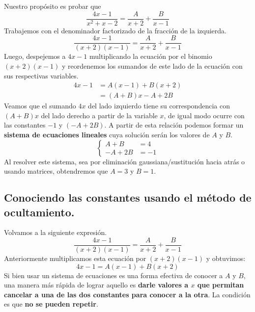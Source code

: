 \documentclass[12pt]{article}
\begin{document}
Nuestro propósito es probar que
\[
  \frac{4x - 1}{x^{2} + x - 2} = \frac{A}{x + 2} + \frac{B}{x - 1}
\]
Trabajemos con el denominador factorizado de la fracción de la izquierda.
\[
  \frac{4x - 1}{(x + 2)(x - 1)} = \frac{A}{x + 2} + \frac{B}{x - 1}
\]
Luego, despejemos a $4x - 1$ multiplicando la ecuación por el binomio $(x + 2)(x - 1)$ y reordenemos los sumandos de este lado de la ecuación con sus respectivas variables.
\begin{align*}
  4x - 1 &= A(x - 1) + B(x + 2) \\
         &= (A + B)x - A + 2B
\end{align*}
Veamos que el sumando $4x$ del lado izquierdo tiene su correspondencia con $(A + B)x$ del lado derecho a partir de la variable $x$, de igual modo ocurre con las constantes $-1$ y $(-A + 2B)$. A partir de esta relación podemos formar un \textbf{sistema de ecuaciones lineales} cuya solución serán los valores de $A$ y $B$.
\[
\left\{
\begin{aligned}
A + B &= 4 \\
-A + 2B &= -1
\end{aligned}
\right.
\]
Al resolver este sistema, sea por eliminación gaussiana/sustitución hacia atrás o usando matrices, obtendremos que $A = 3$ y $B = 1$.

\subsection{Conociendo las constantes usando el método de ocultamiento.}

Volvamos a la siguiente expresión.
\[
  \frac{4x - 1}{(x + 2)(x - 1)} = \frac{A}{x + 2} + \frac{B}{x - 1}
\]
Anteriormente multiplicamos esta ecuación por $(x + 2)(x - 1)$ y obtuvimos:
\[
  4x - 1 = A(x - 1) + B(x + 2)
\]
Si bien usar un sistema de ecuaciones es una forma efectiva de conocer a $A$ y $B$, una manera más rápida de lograr aquello es \textbf{darle valores a $x$ que permitan cancelar a una de las dos constantes para conocer a la otra}. La condición es que \textbf{no se pueden repetir}.
\end{document}
